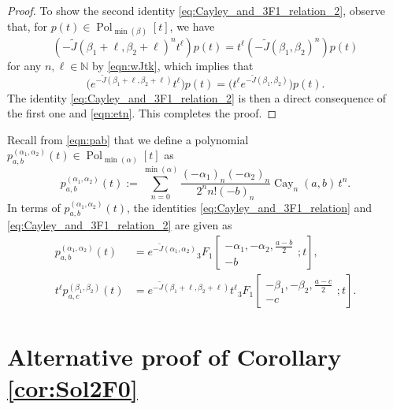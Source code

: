 \documentclass[a4paper,11pt,reqno]{amsart}
\newcommand{\NN}{\mathbb{N}}
\newcommand{\0}{{\bf 0}}
\newcommand{\1}{{\bf 1}}
\DeclareMathOperator{\Cay}{Cay}
\DeclareMathOperator{\Pol}{Pol}
\newcommand{\wJ}{\widetilde{J}}
\theoremstyle{plain}
\theoremstyle{definition}
\numberwithin{equation}{section}
\theoremstyle{definition}
\begin{document}
\begin{appendices}
\begin{proof}
To show the second identity
\eqref{eq:Cayley_and_3F1_relation_2},
observe that, for $p(t) \in \Pol_{\min(\beta)}[t]$,
we have 
\begin{equation*}
(-\wJ(\beta_1+\ell, \beta_2+\ell)^nt^\ell)p(t) 
=t^\ell(-\wJ(\beta_1, \beta_2)^n)p(t) 
\end{equation*}
for any $n, \ell \in \NN$ by \eqref{eqn:wJtk}, which implies that
\begin{equation}\label{eqn:etn}
\big(e^{-\wJ(\beta_1+\ell, \beta_2+\ell)} t^\ell)
p(t)
= \big(t^\ell e^{-\wJ(\beta_1, \beta_2)}\big)p(t).
\end{equation}
The identity \eqref{eq:Cayley_and_3F1_relation_2}
is then a direct consequence of the first one and \eqref{eqn:etn}.
This completes the proof.
\end{proof}

Recall from \eqref{eqn:pab} that we define a polynomial $p^{(\alpha_1, \alpha_2)}_{a,b}(t) \in \Pol_{\min(\alpha)}[t]$ as 
\begin{equation*}
p^{(\alpha_1, \alpha_2)}_{a,b}(t)
:=\sum_{n=0}^{\min(\alpha)}\frac{(-\alpha_1)_n(-\alpha_2)_n}{2^n n!(-b)_n}
\Cay_n(a,b)\,t^n.
\end{equation*}
In terms of $p^{(\alpha_1, \alpha_2)}_{a,b}(t)$, the identities
\eqref{eq:Cayley_and_3F1_relation} and \eqref{eq:Cayley_and_3F1_relation_2}
are given as
\begin{align}
p^{(\alpha_1, \alpha_2)}_{a,b}(t)&=
e^{-\wJ(\alpha_1, \alpha_2)}{}_3F_1\left[\begin{matrix}
    -\alpha_1, -\alpha_2, \frac{a-b}{2}\\
    -b
\end{matrix}; t\right],\label{eqn:p3F1}\\[3pt]
t^\ell p^{(\beta_1, \beta_2)}_{a,c}(t)&=e^{-\wJ(\beta_1 + \ell, \beta_2 + \ell)}t^{\ell}{}_3F_1\left[\begin{matrix}
    -\beta_1, -\beta_2, \frac{a-c}{2}\\
    -c
\end{matrix}; t\right]. \nonumber
\end{align}


\section{Alternative proof of Corollary \texorpdfstring{\ref{cor:Sol2F0}}{9.27}}
\label{appendix:2F0}


\end{appendices}
\end{document}
